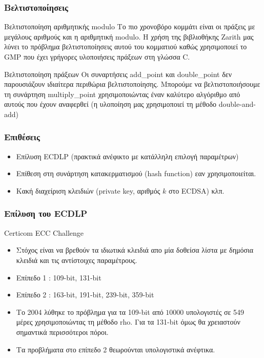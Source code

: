 \documentclass{beamer}
\begin{document}
%
\begin{frame}
\frametitle{Βελτιστοποίησεις}
\begin{block}
{Βελτιστοποίηση αριθμητικής modulo}
Το πιο χρονοβόρο κομμάτι είναι οι πράξεις με μεγάλους αριθμούς και η αριθμητική modulo. Η χρήση της βιβλιοθήκης Zarith μας λύνει το πρόβλημα βελτιστοποίησεις αυτού του κομματιού καθώς χρησιμοποιεί το GMP που έχει γρήγορες υλοποιήσεις πράξεων στη γλώσσα C.
\end{block}
\begin{block}
{Βελτιστοποίηση πράξεων}
Οι συναρτήσεις add\_point και double\_point δεν παρουσιάζουν ιδιαίτερα περιθώρια βελτιστοποίησης. Μπορούμε να βελτιστοποιήσουμε τη συνάρτηση multiply\_point χρησιμοποιώντας έναν καλύτερο αλγόριθμο από αυτούς που έχουν αναφερθεί (η υλοποίηση μας χρησιμοποιεί τη μέθοδο double-and-add)
\end{block}
\end{frame}

%
\begin{frame}
\frametitle{Επιθέσεις}
\begin{itemize}
\item Επίλυση ECDLP (πρακτικά ανέφικτο με κατάλληλη επιλογή παραμέτρων)
\item Επίθεση στη συνάρτηση κατακερματισμού (hash function) εαν χρησιμοποιείται.
\item  Κακή διαχείριση κλειδιών (private key, αριθμός $k$ στο ECDSA) κλπ.
\end{itemize}
\end{frame}

%
\begin{frame}
\frametitle{Επίλυση του ECDLP}
\begin{block}
{Certicom ECC Challenge}
\begin{itemize}
\item Στόχος είναι να βρεθούν τα ιδιωτικά κλειδιά απο μία δοθείσα λίστα με δημόσια κλειδιά και τις αντίστοιχες παραμέτρους.
\item Επίπεδο 1 : 109-bit, 131-bit
\item Επίπεδο 2 : 163-bit, 191-bit, 239-bit, 359-bit
\item Το 2004 λύθηκε το πρόβλημα για τα 109-bit από $10000$ υπολογιστές σε 549 μέρες χρησιμοποιώντας τη μέθοδο rho. Για τα 131-bit όμως θα χρειαστούν σημαντικά περισσότεροι πόροι.
\item Τα προβλήματα στο επίπεδο 2 θεωρούνται υπολογιστικά ανέφτικα.
\end{itemize}
\end{block}
\end{frame}
\end{document}
